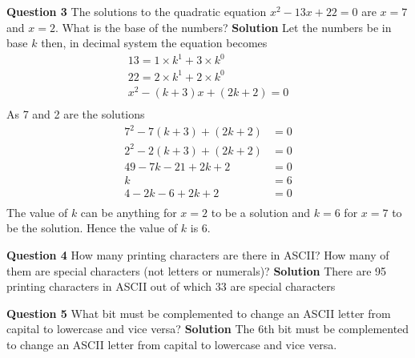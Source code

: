 \documentclass{article}
\begin{document}
\begin{enumerate}
\end{enumerate}

\textbf{Question 3}\newline
The solutions to the quadratic equation $x^2-13x+22 = 0$ are $x = 7$ and $x = 2$. What is the base of the numbers?\newline
\textbf{Solution}\newline
Let the numbers be in base $k$ then, in decimal system the equation becomes
\begin{align*}
	13 = 1\times k^1+3\times k^0\\
	22 = 2\times k^1 + 2\times k^0\\
	x^2 - (k+3)x + (2k+2) = 0\\
\end{align*}
As 7 and 2 are the solutions
\begin{align*}
	7^2 - 7(k+3) + (2k+2) &= 0\\
	2^2 - 2(k+3) + (2k+2) &= 0\\
	49-7k-21+2k+2 &= 0\\
	k &= 6\\
	4-2k-6+2k+2 &= 0\\
\end{align*}
The value of $k$ can be anything for $x=2$ to be a solution and $k = 6$ for $x=7$ to be the solution. Hence the value of $k$ is 6.

\textbf{Question 4}\newline
How many printing characters are there in ASCII? How many of them are special characters (not letters or numerals)?\newline
\textbf{Solution}\newline
There are 95 printing characters in ASCII out of which 33 are special characters

\textbf{Question 5}\newline
What bit must be complemented to change an ASCII letter from capital to lowercase and vice versa?\newline
\textbf{Solution}\newline
The 6th bit must be complemented to change an ASCII letter from capital to lowercase and vice versa.
\end{document}
